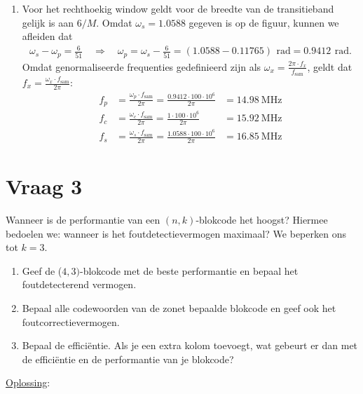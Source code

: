 \documentclass{kuburgiearticle}
\begin{document}
\begin{enumerate}
		\item Voor het rechthoekig window geldt voor de breedte van de transitieband gelijk is aan \(6/M\). Omdat \(\omega_s = 1.0588\) gegeven is op de figuur, kunnen we afleiden dat \begin{align*}
			\omega_s - \omega_p = \frac{6}{51} \quad \Longrightarrow \quad \omega_p  = \omega_s - \frac{6}{51} = (1.0588-0.11765) \,\SI{}{\radian} = 0.9412 \,\SI{}{\radian}.
		\end{align*} Omdat genormaliseerde frequenties gedefinieerd zijn als \(\omega_x = \frac{2\pi \cdot f_x}{f_\text{sam}}\), geldt dat \(f_x = \frac{\omega_x \cdot f_\text{sam}}{2 \pi}\): \begin{align*}
			f_p &= \frac{\omega_p \cdot f_\text{sam}}{2 \pi} = \frac{0.9412 \cdot 100 \cdot 10^6}{2 \pi} &= \SI{14.98}{\mega\hertz}\\
			f_c &= \frac{\omega_c \cdot f_\text{sam}}{2 \pi} = \frac{1 \cdot 100 \cdot 10^6}{2 \pi} &= \SI{15.92}{\mega\hertz}\\
			f_s &= \frac{\omega_s \cdot f_\text{sam}}{2 \pi} = \frac{1.0588 \cdot 100 \cdot 10^6}{2 \pi} &= \SI{16.85}{\mega\hertz}
		\end{align*}
	\end{enumerate}

	\section*{Vraag 3}

	Wanneer is de performantie van een \((n,k)\)-blokcode het hoogst? Hiermee bedoelen we: wanneer is het foutdetectievermogen maximaal? We beperken ons tot \(k=3\).

	\begin{enumerate}
		\item Geef de (\(4,3)\)-blokcode met de beste performantie en bepaal het foutdetecterend vermogen.
		\item Bepaal alle codewoorden van de zonet bepaalde blokcode en geef ook het foutcorrectievermogen.
		\item Bepaal de efficiëntie. Als je een extra kolom toevoegt, wat gebeurt er dan met de efficiëntie en de performantie van je blokcode?
	\end{enumerate}

	\underline{Oplossing}:
\end{document}
